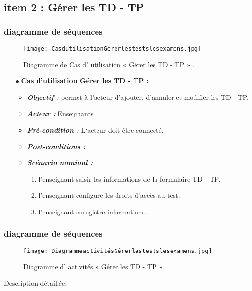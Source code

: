 \subsection{item 2 : Gérer les  TD  -  TP}

\subsubsection{diagramme de séquences }
\begin{figure}[ht]
	\centering
	\texttt{[image: CasdutilisationGérerlestestslesexamens.jpg]}
	\caption{Diagramme de Cas d' utilisation « Gérer les  TD  -  TP » .}
	\label{fig:Diagramme de Cas d' utilisation  Gérer les  TD  -  TP }
\end{figure}
\FloatBarrier
\begin{itemize}
	\item[$\bullet$] \textbf{Cas d’utilisation  Gérer les  TD  -  TP :} 
	\medskip
	\begin{itemize}
		\item \textit{\textbf{Objectif :}} permet à l’acteur d’ajouter, d’annuler et modifier les  TD  -  TP.
		\item \textit{\textbf{Acteur :}} Enseignants
		
		\item \textit{\textbf{Pré-condition  :}} L‘acteur doit être connecté.
		\item \textit{\textbf{Post-conditions   :}}
		\item \textit{\textbf{Scénario nominal :}}
		\begin{enumerate} 
			\item  l'enseignant saisir les informations de la formulaire TD  -  TP. 
			\item     l'enseignant configure les droits d’accès au test. 
			\item   l'enseignant enregistre informations .


		\end{enumerate}
	\end{itemize}
\end{itemize}	
\bigskip
\subsubsection{diagramme de séquences }
\begin{figure}[ht]
	\centering
	\texttt{[image: DiagrammeactivitésGérerlestestslesexamens.jpg]}
	\caption{Diagramme d' activités « Gérer les  TD  -  TP » .}
	\label{fig:Diagramme d' activités  Gérer les  TD  -  TP }
\end{figure}
\FloatBarrier
{\Large \color{cyan} Description détaillée:}

